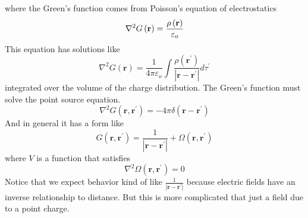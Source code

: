 \documentclass{article}
\begin{document}
where the Green's function comes from Poisson's equation of electrostatics%
\begin{equation*}
\nabla ^{2}G\left( \mathbf{r}\right) =\frac{\rho \left( \mathbf{r}\right) }{%
\varepsilon _{o}}
\end{equation*}%
This equation has solutions like 
\begin{equation*}
\nabla ^{2}G\left( \mathbf{r}\right) =\frac{1}{4\pi \varepsilon _{o}}\int 
\frac{\rho \left( \mathbf{r}^{\prime }\right) }{\left\vert \mathbf{r}-%
\mathbf{r}^{\prime }\right\vert }d\tau ^{\prime }
\end{equation*}%
integrated over the volume of the charge distribution. The Green's function
must solve the point source equation. 
\begin{equation*}
\nabla ^{2}G\left( \mathbf{r},\mathbf{r}^{\prime }\right) =-4\pi \delta
\left( \mathbf{r}-\mathbf{r}^{\prime }\right)
\end{equation*}%
And in general it has a form like 
\begin{equation*}
G\left( \mathbf{r},\mathbf{r}^{\prime }\right) =\frac{1}{\left\vert \mathbf{r%
}-\mathbf{r}^{\prime }\right\vert }+\Omega \left( \mathbf{r},\mathbf{r}%
^{\prime }\right)
\end{equation*}%
where $V$ is a function that satisfies 
\begin{equation*}
\nabla ^{2}\Omega \left( \mathbf{r},\mathbf{r}^{\prime }\right) =0
\end{equation*}%
Notice that we expect behavior kind of like $\frac{1}{\left\vert \mathbf{r}-%
\mathbf{r}^{\prime }\right\vert }$ because electric fields have an inverse
relationship to distance. But this is more complicated that just a field due
to a point charge.
\end{document}
